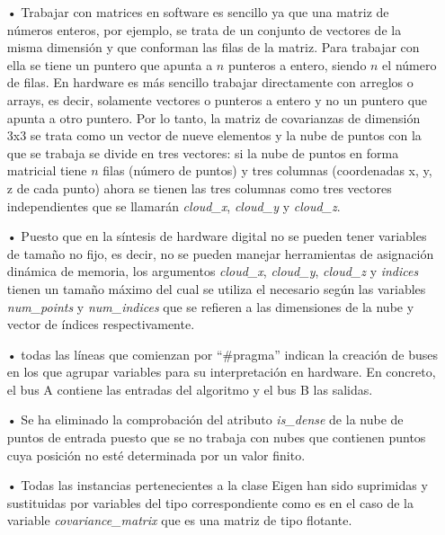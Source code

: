 \begin{itemize}
\item[•] Trabajar con matrices en software es sencillo ya que una matriz de números enteros, por ejemplo, se trata de un conjunto de vectores de la misma dimensión y que conforman las filas de la matriz. Para trabajar con ella se tiene un puntero que apunta a $n$ punteros a entero, siendo $n$ el número de filas. En hardware es más sencillo trabajar directamente con arreglos o arrays, es decir, solamente vectores o punteros a entero y no un puntero que apunta a otro puntero. Por lo tanto, la matriz de covarianzas de dimensión 3x3 se trata como un vector de nueve elementos y la nube de puntos con la que se trabaja se divide en tres vectores: si la nube de puntos en forma matricial tiene $n$ filas (número de puntos) y tres columnas (coordenadas x, y, z de cada punto) ahora se tienen las tres columnas como tres vectores independientes que se llamarán \textit{cloud\_x}, \textit{cloud\_y} y \textit{cloud\_z}.

\item[•] Puesto que en la síntesis de hardware digital no se pueden tener variables de tamaño no fijo, es decir, no se pueden manejar herramientas de asignación dinámica de memoria, los argumentos \textit{cloud\_x}, \textit{cloud\_y}, \textit{cloud\_z} y \textit{indices} tienen un tamaño máximo del cual se utiliza el necesario según las variables \textit{num\_points} y \textit{num\_indices} que se refieren a las dimensiones de la nube y vector de índices respectivamente.

\item[•] todas las líneas que comienzan por ``\#pragma'' indican la creación de buses en los que agrupar variables para su interpretación en hardware. En concreto, el bus A contiene las entradas del algoritmo y el bus B las salidas. 

\item[•] Se ha eliminado la comprobación del atributo \textit{is\_dense} de la nube de puntos de entrada puesto que se no trabaja con nubes que contienen puntos cuya posición no esté determinada por un valor finito.

\item[•] Todas las instancias pertenecientes a la clase Eigen han sido suprimidas y sustituidas por variables del tipo correspondiente como es en el caso de la variable \textit{covariance\_matrix} que es una matriz de tipo flotante.

\end{itemize}

